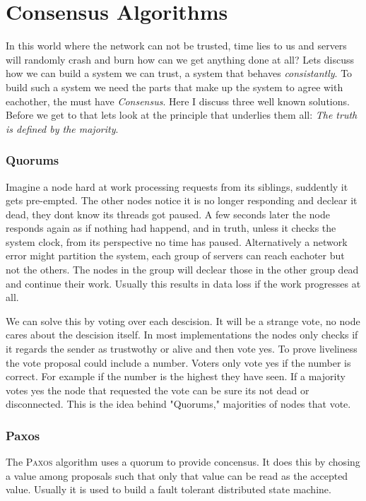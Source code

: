 \section{Consensus Algorithms}
In this world where the network can not be trusted, time lies to us and servers will randomly crash and burn how can we get anything done at all? Lets discuss how we can build a system we can trust, a system that behaves \textit{consistantly}. To build such a system we need the parts that make up the system to agree with eachother, the must have \emph{Consensus}. Here I discuss three well known solutions. Before we get to that lets look at the principle that underlies them all: \emph{The truth is defined by the majority}.

\subsubsection*{Quorums}
Imagine a node hard at work processing requests from its siblings, suddently it gets pre-empted. The other nodes notice it is no longer responding and declear it dead, they dont know its threads got paused. A few seconds later the node responds again as if nothing had happend, and in truth, unless it checks the system clock, from its perspective no time has paused. Alternatively a network error might partition the system, each group of servers can reach eachoter but not the others. The nodes in the group will declear those in the other group dead and continue their work. Usually this results in data loss if the work progresses at all.

We can solve this by voting over each descision. It will be a strange vote, no node cares about the descision itself. In most implementations the nodes only checks if it regards the sender as trustwothy or alive and then vote yes. To prove liveliness the vote proposal could include a number. Voters only vote yes if the number is correct. For example if the number is the highest they have seen. If a majority votes yes the node that requested the vote can be sure its not dead or disconnected. This is the idea behind "Quorums," majorities of nodes that vote.

\subsubsection*{Paxos}
The \textsc{Paxos} algorithm\cite{paxos} uses a quorum to provide concensus. It does this by chosing a value among proposals such that only that value can be read as the accepted value. Usually it is used to build a fault tolerant distributed state machine. 

